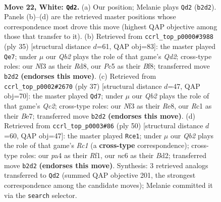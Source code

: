 \documentclass[11pt]{article}
\begin{document}
\clearpage

\begin{figure}[p]\centering
\begin{subfigure}{0.46\textwidth}\centering
\resizebox{\linewidth}{!}{%
\newchessgame
\chessboard[
  setfen={1rr3k1/1p1bqppp/2n1p3/2Pp3P/p2P4/P1P2N2/RQ2BPP1/2R3K1 w - - 1 22},
  showmover=false,
  pgfstyle=straightmove, color=movearrow, markmove={b2-d2}
]}
\caption{}
\end{subfigure}\hfill
\begin{subfigure}{0.46\textwidth}\centering
\resizebox{\linewidth}{!}{%
\newchessgame
\chessboard[
  setfen={1k1r1br1/ppnq4/2p1pp2/6p1/2PPN2p/4B2P/PPQ2PP1/3RR1K1 b - - 4 18},
  showmover=false,
  pgfstyle=straightmove, color=movearrow, markmove={d7-e7}
]}
\caption{}
\end{subfigure}
\\[4pt]
\begin{subfigure}{0.46\textwidth}\centering
\resizebox{\linewidth}{!}{%
\newchessgame
\chessboard[
  setfen={2r1r1k1/1pq1bpp1/p2ppn2/7p/2PNP2P/4BP2/PP1Q2P1/1KR3R1 b - - 4 19},
  showmover=false,
  pgfstyle=straightmove, color=movearrow, markmove={c7-d7}
]}
\caption{}
\end{subfigure}\hfill
\begin{subfigure}{0.46\textwidth}\centering
\resizebox{\linewidth}{!}{%
\newchessgame
\chessboard[
  setfen={1r3r1k/3qb1pp/3ppn2/2p5/Pp1pPP2/1P1P2NP/3BQ1PK/2R2R2 w - - 3 26},
  showmover=false,
  pgfstyle=straightmove, color=movearrow, markmove={c1-e1}
]}
\caption{}
\end{subfigure}
\caption{\textbf{Move 22, White: \texttt{Qd2}.} (a) Our position; Melanie plays \texttt{Qd2} (\texttt{b2d2}). Panels (b)--(d) are the retrieved master positions whose correspondence most drove this move (highest QAP objective among those that transfer to it). (b) Retrieved from \texttt{ccrl\_top\_p0000\#3988} (ply 35) [structural distance $d$=61, QAP obj=83]: the master played \texttt{Qe7}; under $\mu$ our \emph{Qb2} plays the role of that game's \emph{Qd2}; cross-type roles: our \emph{N}f3 as their \emph{R}d8, our \emph{P}c5 as their \emph{B}f8; transferred move \texttt{b2d2} \textbf{(endorses this move)}. (c) Retrieved from \texttt{ccrl\_top\_p0002\#2670} (ply 37) [structural distance $d$=47, QAP obj=70]: the master played \texttt{Qd7}; under $\mu$ our \emph{Qb2} plays the role of that game's \emph{Qc2}; cross-type roles: our \emph{N}f3 as their \emph{R}e8, our \emph{R}c1 as their \emph{B}e7; transferred move \texttt{b2d2} \textbf{(endorses this move)}. (d) Retrieved from \texttt{ccrl\_top\_p0003\#86} (ply 50) [structural distance $d$=60, QAP obj=47]: the master played \texttt{Rce1}; under $\mu$ our \emph{Qb2} plays the role of that game's \emph{Rc1} (a \textbf{cross-type} correspondence); cross-type roles: our \emph{p}a4 as their \emph{R}f1, our \emph{n}c6 as their \emph{B}d2; transferred move \texttt{b2d2} \textbf{(endorses this move)}. Synthesis: 3 retrieved analogs transferred to \texttt{Qd2} (summed QAP objective 201, the strongest correspondence among the candidate moves); Melanie committed it via the \texttt{search} selector.}
\label{fig:thought-m42}
\end{figure}
\end{document}

